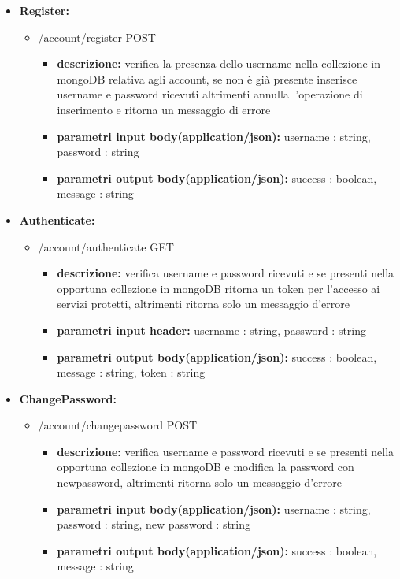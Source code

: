 {{\begin{itemize}
		\item \textbf{Register:}
			\begin{itemize}
			\item  /account/register POST
				\begin{itemize} 
				\item \textbf{descrizione:} verifica la presenza dello username nella collezione in mongoDB relativa agli account, se non \`{e} gi\`{a} presente inserisce username e password ricevuti altrimenti annulla l'operazione di inserimento e ritorna un messaggio di errore
				\item \textbf{parametri input body(application/json):} username : string, password : string
				\item \textbf{parametri output body(application/json):} success : boolean, message : string
				\end{itemize}
			\end{itemize}
			
		\item \textbf{Authenticate:}
			\begin{itemize}
			\item  /account/authenticate GET
				\begin{itemize} 
				\item \textbf{descrizione:} verifica username e password ricevuti e se presenti nella opportuna collezione in mongoDB ritorna un token per l'accesso ai servizi protetti, altrimenti ritorna solo un messaggio d'errore
				\item \textbf{parametri input header:} username : string, password : string
				\item \textbf{parametri output body(application/json):} success : boolean, message : string, token : string
				\end{itemize}
			\end{itemize}
				
		\item \textbf{ChangePassword:}
			\begin{itemize}
			\item  /account/changepassword POST
				\begin{itemize} 
				\item \textbf{descrizione:} verifica username e password ricevuti e se presenti nella opportuna collezione in mongoDB e modifica la password con newpassword, altrimenti ritorna solo un messaggio d'errore
				\item \textbf{parametri input body(application/json):} username : string, password : string, new password : string
				\item \textbf{parametri output body(application/json):} success : boolean, message : string
				\end{itemize}
			\end{itemize}
			

\end{itemize}}}
